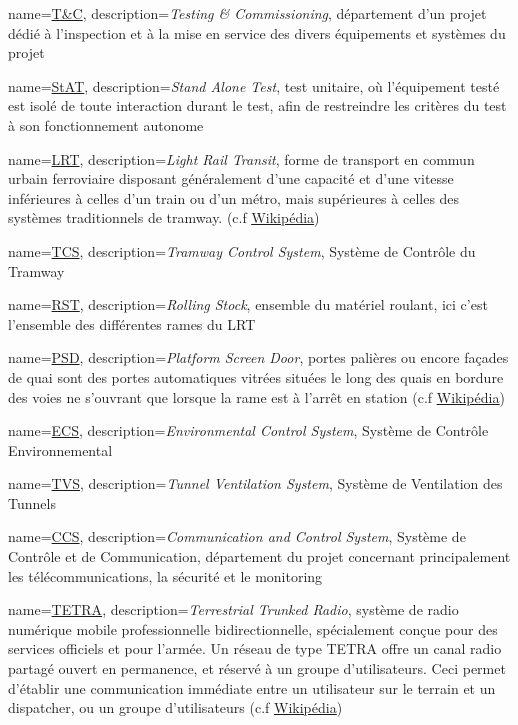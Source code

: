 \usepackage[toc,section=chapter]{glossaries}    %

\makeglossaries

{
	name=\underline{T\&C},
	description={\textit{Testing \& Commissioning}, département d'un projet dédié à l'inspection et à la mise en service des divers équipements et systèmes du projet}
}

{
	name=\underline{StAT},
	description={\textit{Stand Alone Test}, test unitaire, où l'équipement testé est isolé de toute interaction durant le test, afin de restreindre les critères du test à son fonctionnement autonome  }
}

{
	name=\underline{LRT},
	description={\textit{Light Rail Transit}, forme de transport en commun urbain ferroviaire disposant généralement d'une capacité et d'une vitesse inférieures à celles d'un train ou d'un métro, mais supérieures à celles des systèmes traditionnels de tramway. (c.f  \underline{\href{https://fr.wikipedia.org/wiki/Métro_léger}{Wikipédia}})}
	}

{
	name=\underline{TCS},
	description={\textit{Tramway Control System}, Système de Contrôle du Tramway}
}

{
	name=\underline{RST},
	description={\textit{Rolling Stock}, ensemble du matériel roulant, ici c'est l'ensemble des différentes rames du LRT}
}

{
	name=\underline{PSD},
	description={\textit{Platform Screen Door}, portes palières ou encore façades de quai sont des portes automatiques vitrées situées le long des quais en bordure des voies ne s'ouvrant que lorsque la rame est à l'arrêt en station (c.f  \underline{\href{https://fr.wikipedia.org/wiki/Porte_palière_(métro)}{Wikipédia}})}
}

{
	name=\underline{ECS},
	description={\textit{Environmental Control System}, Système de Contrôle Environnemental}
}

{
	name=\underline{TVS},
	description={\textit{Tunnel Ventilation System},  Système de Ventilation des Tunnels }
}

{
	name=\underline{CCS},
	description={\textit{Communication and Control System}, Système de Contrôle et de Communication, département du projet concernant principalement les télécommunications, la sécurité et le monitoring}
}

{
	name=\underline{TETRA},
	description={\textit{Terrestrial Trunked Radio}, système de radio numérique mobile professionnelle bidirectionnelle, spécialement conçue pour des services officiels et pour l'armée. Un réseau de type TETRA offre un canal radio partagé ouvert en permanence, et réservé à un groupe d'utilisateurs. Ceci permet d'établir une communication immédiate entre un utilisateur sur le terrain et un dispatcher, ou un groupe d'utilisateurs (c.f \underline{\href{https://fr.wikipedia.org/wiki/Terrestrial_Trunked_Radio}{Wikipédia}})}
}

